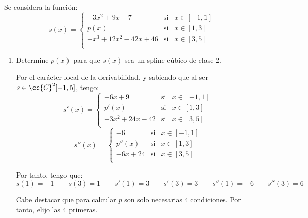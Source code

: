 \begin{ejercicio}
    Se considera la función:
    \begin{equation*}
        s(x)=\left\{\begin{array}{lll}
            -3x^2 + 9x - 7 & \text{si} & x\in [-1, 1]\\
            p(x) & \text{si} & x\in [1, 3]\\
            -x^3 + 12x^2 - 42x + 46 & \text{si} & x\in [3, 5]\\
        \end{array} \right.
    \end{equation*}

    \begin{enumerate}
        \item Determine $p(x)$ para que $s(x)$ sea un spline cúbico de clase 2.

        Por el carácter local de la derivabilidad, y sabiendo que al ser $s\in \cc{C}^2[-1,5]$, tengo:
        \begin{equation*}
            s'(x)=\left\{\begin{array}{lll}
                -6x + 9 & \text{si} & x\in [-1, 1]\\
                p'(x) & \text{si} & x\in [1, 3]\\
                -3x^2 + 24x - 42 & \text{si} & x\in [3, 5]\\
            \end{array} \right.
        \end{equation*}
        \begin{equation*}
            s''(x)=\left\{\begin{array}{lll}
                -6 & \text{si} & x\in [-1, 1]\\
                p''(x) & \text{si} & x\in [1, 3]\\
                -6x + 24& \text{si} & x\in [3, 5]\\
            \end{array} \right.
        \end{equation*}

        Por tanto, tengo que:
        \begin{equation*}
            s(1)=-1 \qquad s(3)=1 \qquad s'(1)=3 \qquad s'(3)=3 \qquad s''(1)=-6 \qquad s''(3)=6
        \end{equation*}

        Cabe destacar que para calcular $p$ son solo necesarias 4 condiciones. Por tanto, elijo las 4 primeras.


\end{enumerate}
\end{ejercicio}
